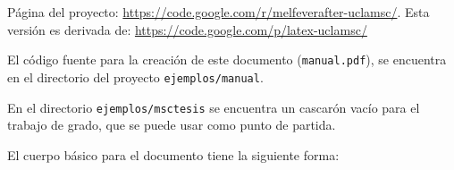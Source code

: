 \introduccion


\noindent
Página del proyecto: \url{https://code.google.com/r/melfeverafter-uclamsc/}. Esta versión es derivada de: \url{https://code.google.com/p/latex-uclamsc/}

El código fuente para la creación de este documento (\texttt{manual.pdf}), se encuentra en el directorio del proyecto \texttt{ejemplos/manual}.

En el directorio \texttt{ejemplos/msctesis} se encuentra un cascarón vacío para el trabajo de grado, que se puede usar como punto de partida.


El cuerpo básico para el documento tiene la siguiente forma:


